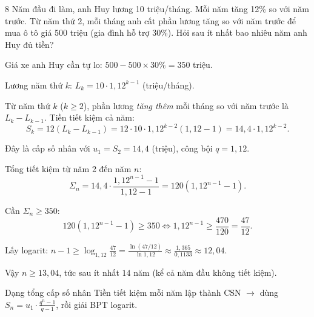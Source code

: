 \separator

\begin{baitoan}{8 \hfill {}}
Năm đầu đi làm, anh Huy lương 10 triệu/tháng. Mỗi năm tăng 12\% so với năm trước. Từ năm thứ 2, mỗi tháng anh cất phần lương tăng so với năm trước để mua ô tô giá 500 triệu (gia đình hỗ trợ 30\%). Hỏi sau ít nhất bao nhiêu năm anh Huy đủ tiền?
\end{baitoan}

\begin{loigiai}
Giá xe anh Huy cần tự lo: $500 - 500 \times 30\% = 350$ triệu.

Lương năm thứ $k$: $L_k = 10 \cdot 1{,}12^{k-1}$ (triệu/tháng).

Từ năm thứ $k$ ($k \ge 2$), phần lương \textit{tăng thêm} mỗi tháng so với năm trước là $L_k - L_{k-1}$. Tiền tiết kiệm cả năm:
\[ S_k = 12(L_k - L_{k-1}) = 12 \cdot 10 \cdot 1{,}12^{k-2}(1{,}12 - 1) = 14{,}4 \cdot 1{,}12^{k-2}. \]

Đây là cấp số nhân với $u_1 = S_2 = 14{,}4$ (triệu), công bội $q = 1{,}12$.

Tổng tiết kiệm từ năm 2 đến năm $n$:
\[ \Sigma_n = 14{,}4 \cdot \frac{1{,}12^{n-1} - 1}{1{,}12 - 1} = 120(1{,}12^{n-1} - 1). \]

Cần $\Sigma_n \ge 350$:
\[ 120(1{,}12^{n-1} - 1) \ge 350 \Leftrightarrow 1{,}12^{n-1} \ge \frac{470}{120} = \frac{47}{12}. \]

Lấy logarit: $n - 1 \ge \log_{1{,}12}\!\frac{47}{12} = \frac{\ln(47/12)}{\ln 1{,}12} \approx \frac{1{,}365}{0{,}1133} \approx 12{,}04$.

Vậy $n \ge 13{,}04$, tức sau ít nhất $\boxed{14}$ năm (kể cả năm đầu không tiết kiệm).
\end{loigiai}

\begin{meobotui}{Dạng tổng cấp số nhân}
Tiền tiết kiệm mỗi năm lập thành CSN $\to$ dùng $S_n = u_1 \cdot \frac{q^n - 1}{q - 1}$, rồi giải BPT logarit.
\end{meobotui}
